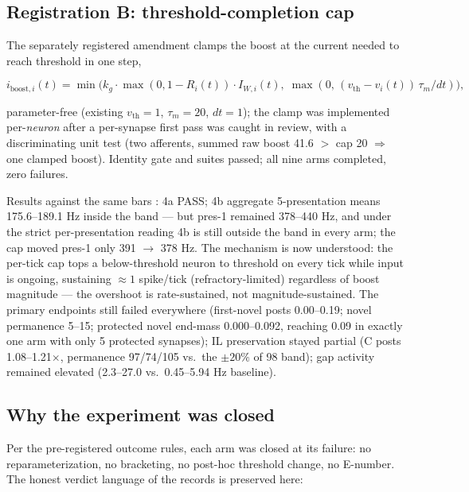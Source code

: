 \subsection{Registration B: threshold-completion cap}

The separately registered amendment \cite{rg8c} clamps the boost at the
current needed to reach threshold in one step,

\begin{equation}
  i_{\mathrm{boost},i}(t) = \min\!\Big(
    k_g \cdot \max(0,1-R_i(t)) \cdot I_{W,i}(t),\;
    \max(0,\,(v_{\mathrm{th}} - v_i(t))\,\tau_m/dt)
  \Big),
\end{equation}

parameter-free (existing \(v_{\mathrm{th}}=1\), \(\tau_m = 20\),
\(dt=1\)); the clamp was implemented per-\emph{neuron} after a
per-synapse first pass was caught in review, with a discriminating unit
test (two afferents, summed raw boost 41.6 \(>\) cap 20 \(\Rightarrow\)
one clamped boost). Identity gate and suites passed; all nine arms
completed, zero failures.

Results against the same bars \cite{rg8c}: 4a PASS; 4b aggregate
5-presentation means 175.6--189.1 Hz inside the band --- but pres-1
remained 378--440 Hz, and under the strict per-presentation reading 4b
is still outside the band in every arm; the cap moved pres-1 only
391 \(\to\) 378 Hz. The mechanism is now understood: the per-tick cap
tops a below-threshold neuron to threshold on every tick while input is
ongoing, sustaining \(\approx 1\) spike/tick (refractory-limited)
regardless of boost magnitude --- the overshoot is
rate-sustained, not magnitude-sustained. The primary endpoints still
failed everywhere (first-novel posts 0.00--0.19; novel permanence
5--15; protected novel end-mass 0.000--0.092, reaching 0.09 in exactly
one arm with only 5 protected synapses); IL preservation stayed partial
(C posts 1.08--1.21\(\times\), permanence 97/74/105 vs.\ the \(\pm20\%\)
of 98 band); gap activity remained elevated (2.3--27.0 vs.\
0.45--5.94 Hz baseline).

\subsection{Why the experiment was closed}

Per the pre-registered outcome rules, each arm was closed at its
failure: no reparameterization, no bracketing, no post-hoc threshold
change, no E-number. The honest verdict language of the records is
preserved here:

